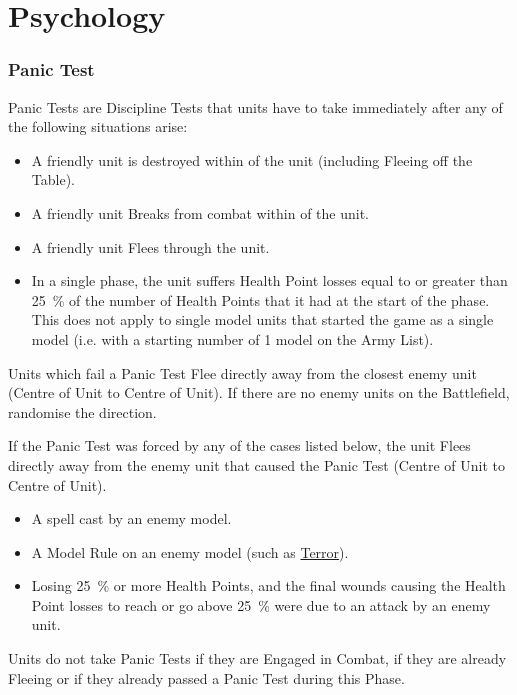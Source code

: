
\part{Psychology}
\label{psychology}

\section{Panic Test}
\label{panic_test}

Panic Tests are Discipline Tests that units have to take immediately after any of the following situations arise:

\begin{itemize}[label={-}]
\item A friendly unit is destroyed within  of the unit (including Fleeing off the Table).
\item A friendly unit Breaks from combat within  of the unit.
\item A friendly unit Flees through the unit.
\item In a single phase, the unit suffers Health Point losses equal to or greater than \SI{25}{\percent} of the number of Health Points that it had at the start of the phase. This does not apply to single model units that started the game as a single model (i.e. with a starting number of 1 model on the Army List).
\end{itemize}

Units which fail a Panic Test Flee directly away from the closest enemy unit (Centre of Unit to Centre of Unit). If there are no enemy units on the Battlefield, randomise the direction.

If the Panic Test was forced by any of the cases listed below, the unit Flees directly away from the enemy unit that caused the Panic Test (Centre of Unit to Centre of Unit).
\begin{itemize}[label={-}]
\item A spell cast by an enemy model.
\item A Model Rule on an enemy model (such as \hyperref[terror]{Terror}).
\item Losing \SI{25}{\percent} or more Health Points, and the final wounds causing the Health Point losses to reach or go above \SI{25}{\percent} were due to an attack by an enemy unit.
\end{itemize}

Units do not take Panic Tests if they are Engaged in Combat, if they are already Fleeing or if they already passed a Panic Test during this Phase.

